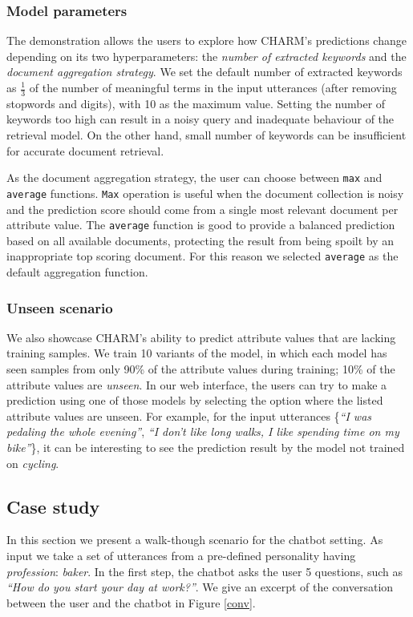 \subsubsection{Model parameters} 
The demonstration allows the users to explore how CHARM's predictions change depending on its two hyperparameters: the \emph{number of extracted keywords} and the \emph{document aggregation strategy}. 
We set the default number of extracted keywords as $\frac{1}{3}$ of the number of meaningful terms in the input utterances (after removing stopwords and digits), 
with 10 as the maximum value.
Setting the number of keywords too high can result in a noisy query and inadequate behaviour of the retrieval model. 
On the other hand, small number of keywords can be insufficient for accurate document retrieval.

As the document aggregation strategy, the user can choose between \texttt{max} and \texttt{average} functions. \texttt{Max} operation is useful when the document collection is noisy and the prediction score should come from a single most relevant document per attribute value. The \texttt{average} function is good to provide a balanced prediction based on all available documents, protecting the result from being spoilt by an inappropriate top scoring document. For this reason we selected \texttt{average} as the default aggregation function.

\subsubsection{Unseen scenario} 
We also showcase CHARM's ability to predict attribute values
that are lacking training samples.
We train 10 variants of the model, in which each model has seen samples from only 90\% of the attribute values during training; 10\% of the attribute values are \emph{unseen}. 
In our web interface, the users can try to make a prediction using one of those models
by selecting the option where the listed attribute values are unseen. 
For example, for the input utterances \{\emph{``I was pedaling the whole evening''}, \emph{``I don't like long walks, I like spending time on my bike''}\}, it can be interesting to see the prediction result by the model not trained on \emph{cycling}. 

\subsection{Case study}
\label{sec:case-study}

In this section we present a walk-though scenario for the chatbot setting. As input we take a set of utterances from a pre-defined personality having \textit{profession}: \textit{baker}. In the first step, the chatbot asks the user 5 questions, such as \emph{``How do you start your day at work?''}. We give an excerpt of the conversation between the user and the chatbot in Figure \ref{conv}. 

